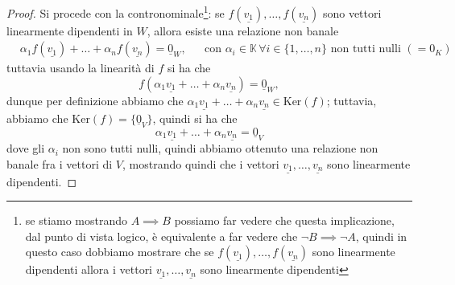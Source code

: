 \begin{proof}
  Si procede con la contronominale\footnote{se stiamo mostrando $A \implies B$ possiamo far vedere che questa implicazione, dal punto di vista logico, è equivalente a far vedere che $\neg B \implies \neg A$, quindi in questo caso dobbiamo mostrare che se $f(\underline{v_1}), \ldots, f(\underline{v_n})$ sono linearmente dipendenti allora i vettori $\underline{v_1}, \ldots, \underline{v_n}$ sono linearmente dipendenti}: se $f(\underline{v_1}), \ldots, f(\underline{v_n})$ sono vettori linearmente dipendenti in $W$, allora esiste una relazione non banale
  \begin{align}
    &\alpha_1 f(\underline{v_1}) + \ldots + \alpha_n f(\underline{v_n}) = \underline{0}_W, & &\text{con } \alpha_i \in \mathbb{K} \, \forall i \in \{1, \ldots, n \} \text{ non tutti nulli }(=0_K)
  \end{align}
  tuttavia usando la linearità di $f$ si ha che
  $$
    f(\alpha_1 \underline{v_1} + \ldots + \alpha_n \underline{v_n}) = \underline{0}_W,
  $$
  dunque per definizione abbiamo che $\alpha_1 \underline{v_1} + \ldots + \alpha_n \underline{v_n} \in \text{Ker}(f)$; tuttavia, abbiamo che $\text{Ker}(f) = \{ \underline{0}_V \}$, quindi si ha che
  $$
    \alpha_1 \underline{v_1} + \ldots + \alpha_n \underline{v_n} = \underline{0}_V
  $$
  dove gli $\alpha_i$ non sono tutti nulli, quindi abbiamo ottenuto una relazione non banale fra i vettori di $V$, mostrando quindi che i vettori $\underline{v_1}, \ldots, \underline{v_n}$ sono linearmente dipendenti.
\end{proof}
